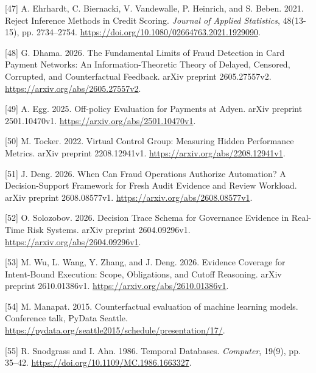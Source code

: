 \documentclass[
  11pt,
]{article}
\newlength{\cslhangindent}
\newlength{\cslentryspacingunit} %
\newenvironment{CSLReferences}[2] %
 {%
  \setlength{\parindent}{0pt}
  \ifodd #1
  \let\oldpar\par
  \def\par{\hangindent=\cslhangindent\oldpar}
  \fi
  \setlength{\parskip}{#2\cslentryspacingunit}
 }%
 {}
\begin{document}
\begin{CSLReferences}{1}{1}
\leavevmode{}%
{[}47{]} A. Ehrhardt, C. Biernacki, V. Vandewalle, P. Heinrich, and S.
Beben. 2021. Reject Inference Methods in Credit Scoring. \emph{Journal
of Applied Statistics}, 48(13-15), pp. 2734--2754.
\url{https://doi.org/10.1080/02664763.2021.1929090}.

\leavevmode{}%
{[}48{]} G. Dhama. 2026. The Fundamental Limits of Fraud Detection in
Card Payment Networks: An Information-Theoretic Theory of Delayed,
Censored, Corrupted, and Counterfactual Feedback. arXiv preprint
2605.27557v2. \url{https://arxiv.org/abs/2605.27557v2}.

\leavevmode{}%
{[}49{]} A. Egg. 2025. Off-policy Evaluation for Payments at Adyen.
arXiv preprint 2501.10470v1. \url{https://arxiv.org/abs/2501.10470v1}.

\leavevmode{}%
{[}50{]} M. Tocker. 2022. Virtual Control Group: Measuring Hidden
Performance Metrics. arXiv preprint 2208.12941v1.
\url{https://arxiv.org/abs/2208.12941v1}.

\leavevmode{}%
{[}51{]} J. Deng. 2026. When Can Fraud Operations Authorize Automation?
A Decision-Support Framework for Fresh Audit Evidence and Review
Workload. arXiv preprint 2608.08577v1.
\url{https://arxiv.org/abs/2608.08577v1}.

\leavevmode{}%
{[}52{]} O. Solozobov. 2026. Decision Trace Schema for Governance
Evidence in Real-Time Risk Systems. arXiv preprint 2604.09296v1.
\url{https://arxiv.org/abs/2604.09296v1}.

\leavevmode{}%
{[}53{]} M. Wu, L. Wang, Y. Zhang, and J. Deng. 2026. Evidence Coverage
for Intent-Bound Execution: Scope, Obligations, and Cutoff Reasoning.
arXiv preprint 2610.01386v1. \url{https://arxiv.org/abs/2610.01386v1}.

\leavevmode{}%
{[}54{]} M. Manapat. 2015. Counterfactual evaluation of machine learning
models. Conference talk, PyData Seattle.
\url{https://pydata.org/seattle2015/schedule/presentation/17/}.

\leavevmode{}%
{[}55{]} R. Snodgrass and I. Ahn. 1986. Temporal Databases.
\emph{Computer}, 19(9), pp. 35--42.
\url{https://doi.org/10.1109/MC.1986.1663327}.


\end{CSLReferences}
\end{document}
